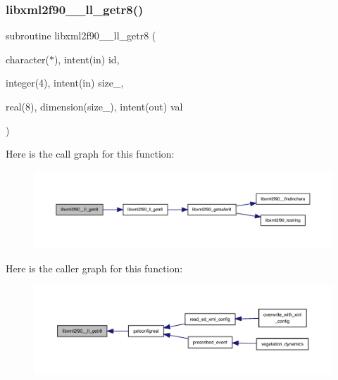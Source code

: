 \subsubsection{\texorpdfstring{libxml2f90\+\_\+\+\_\+ll\+\_\+getr8()}{libxml2f90\_\_ll\_getr8()}}
{\footnotesize\ttfamily subroutine libxml2f90\+\_\+\+\_\+ll\+\_\+getr8 (\begin{DoxyParamCaption}\item[{character($\ast$), intent(in)}]{id,  }\item[{integer(4), intent(in)}]{size\+\_\+,  }\item[{real(8), dimension(size\+\_\+), intent(out)}]{val }\end{DoxyParamCaption})}

Here is the call graph for this function\+:
\nopagebreak
\begin{figure}[H]
\begin{center}
\leavevmode
\includegraphics[width=350pt]{libxml2f90_8f90__pp_8f90_a8f48610de931b9ef342dadfd11a62da0_cgraph}
\end{center}
\end{figure}
Here is the caller graph for this function\+:
\nopagebreak
\begin{figure}[H]
\begin{center}
\leavevmode
\includegraphics[width=350pt]{libxml2f90_8f90__pp_8f90_a8f48610de931b9ef342dadfd11a62da0_icgraph}
\end{center}
\end{figure}
\mbox{\label{libxml2f90_8f90__pp_8f90_a77f33adc7fb009d5c2f4b8e5201c8f44}} 
